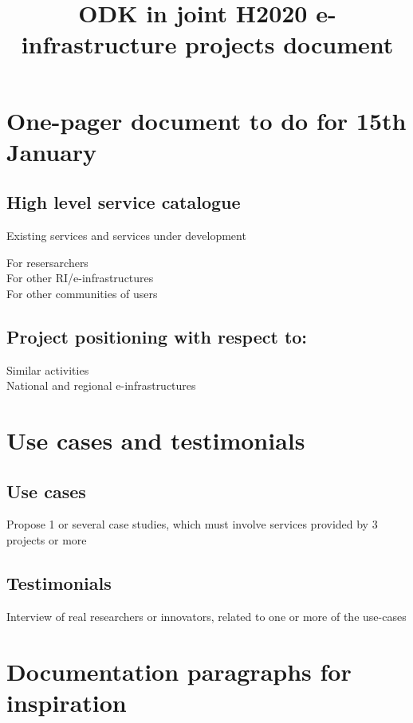 \documentclass[12pt]{amsbook}
\title{ODK in joint H2020 e-infrastructure projects document}
\begin{document}
\maketitle

\section{One-pager document to do for 15th January}
\subsection{High level service catalogue}
Existing services and services under development
\begin{description}
\item[For resersarchers]
\item[For other RI/e-infrastructures]
\item[For other communities of users]
\end{description}

\subsection{Project positioning with respect to:}
\begin{description}
\item[Similar activities]
\item[National and regional e-infrastructures]

\end{description}

\section{Use cases and testimonials}
\subsection{Use cases}
Propose 1 or several case studies, which must involve services provided by 3 projects or more
\subsection{Testimonials}
Interview of real researchers or innovators, related to one or more of the use-cases


\section{Documentation paragraphs for inspiration}
\end{document}
